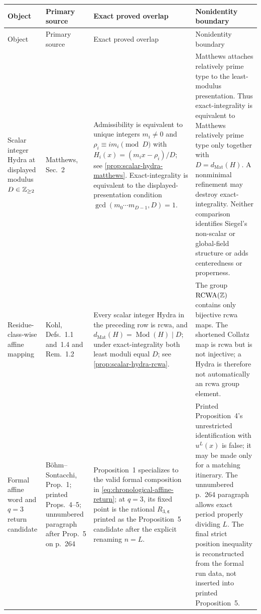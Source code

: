\begingroup\small
\setlength{\tabcolsep}{3pt}
\begin{longtable}{@{}p{}p{}p{}p{}@{}}
\toprule
Object & Primary source & Exact proved overlap & Nonidentity boundary\\
\midrule
\endfirsthead
\toprule
Object & Primary source & Exact proved overlap & Nonidentity boundary\\
\midrule
\endhead
Scalar integer Hydra at displayed modulus $D\in\mathbb Z_{\geq2}$ &
Matthews, Sec.~2 \cite{MatthewsGeneralized} & Admissibility is equivalent to
unique integers $m_i\ne0$ and $\rho_i\equiv im_i\pmod D$ with
$H_i(x)=(m_ix-\rho_i)/D$; see
\cref{prop:scalar-hydra-matthews}.  Exact-integrality is equivalent to
the displayed-presentation condition
$\gcd(m_0\cdots m_{D-1},D)=1$. & Matthews attaches relatively prime type to
the least-modulus presentation.  Thus exact-integrality is equivalent to
Matthews relatively prime type only together with
$D=d_{\mathrm{Mat}}(H)$.  A nonminimal refinement may destroy
exact-integrality.  Neither comparison identifies Siegel's non-scalar or
global-field structure or adds centeredness or properness.\\

Residue-class-wise affine mapping & Kohl, Defs.~1.1 and~1.4 and Rem.~1.2
\cite{KohlRCWA} & Every scalar integer Hydra in the preceding row is rcwa,
and $d_{\mathrm{Mat}}(H)=\operatorname{Mod}(H)\mid D$; under
exact-integrality both least moduli equal $D$; see
\cref{prop:scalar-hydra-rcwa}. & The group
$\operatorname{RCWA}(\mathbb Z)$ contains only bijective rcwa maps.  The shortened
Collatz map is rcwa but is not injective; a Hydra is therefore not
automatically an rcwa group element.\\

Formal affine word and $q=3$ return candidate & B\"ohm--Sontacchi,
Prop.~1; printed Props.~4--5; unnumbered paragraph after Prop.~5 on p.~264
\cite{BohmSontacchi} & Proposition~1 specializes to the valid formal
composition in \cref{eq:chronological-affine-return}; at $q=3$, its fixed
point is the rational $R_{3,\boldsymbol\varepsilon}$ printed as the
Proposition~5 candidate after the explicit renaming $n=L$. & Printed
Proposition~4's unrestricted identification with $u^L(x)$ is false; it may be
made only for a matching itinerary.  The unnumbered p.~264 paragraph allows
exact period properly dividing $L$.  The final strict position inequality is
reconstructed from the formal run data, not inserted into printed
Proposition~5.\\


\end{longtable}
